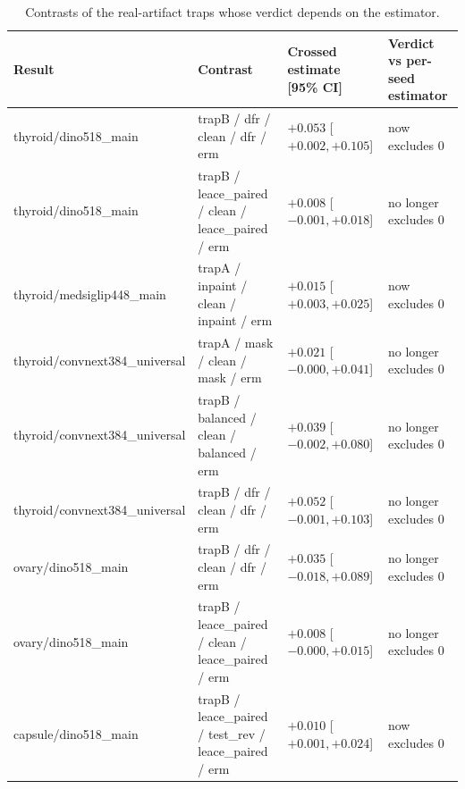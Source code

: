 \begin{table}[H]\centering\scriptsize
\caption{Contrasts of the real-artifact traps whose verdict depends on the estimator.}\label{tab:estchanges}
\begin{tabular}{p{4.2cm}p{5.2cm}p{3.3cm}p{2.6cm}}\toprule
Result & Contrast & Crossed estimate [95\% CI] & Verdict vs per-seed estimator \\\midrule
thyroid/\allowbreak{}dino518\_main & trapB /\allowbreak{} dfr /\allowbreak{} clean /\allowbreak{} dfr /\allowbreak{} erm & $+0.053$ [$+0.002, +0.105$] & now excludes 0 \\
thyroid/\allowbreak{}dino518\_main & trapB /\allowbreak{} leace\_paired /\allowbreak{} clean /\allowbreak{} leace\_paired /\allowbreak{} erm & $+0.008$ [$-0.001, +0.018$] & no longer excludes 0 \\
thyroid/\allowbreak{}medsiglip448\_main & trapA /\allowbreak{} inpaint /\allowbreak{} clean /\allowbreak{} inpaint /\allowbreak{} erm & $+0.015$ [$+0.003, +0.025$] & now excludes 0 \\
thyroid/\allowbreak{}convnext384\_universal & trapA /\allowbreak{} mask /\allowbreak{} clean /\allowbreak{} mask /\allowbreak{} erm & $+0.021$ [$-0.000, +0.041$] & no longer excludes 0 \\
thyroid/\allowbreak{}convnext384\_universal & trapB /\allowbreak{} balanced /\allowbreak{} clean /\allowbreak{} balanced /\allowbreak{} erm & $+0.039$ [$-0.002, +0.080$] & no longer excludes 0 \\
thyroid/\allowbreak{}convnext384\_universal & trapB /\allowbreak{} dfr /\allowbreak{} clean /\allowbreak{} dfr /\allowbreak{} erm & $+0.052$ [$-0.001, +0.103$] & no longer excludes 0 \\
ovary/\allowbreak{}dino518\_main & trapB /\allowbreak{} dfr /\allowbreak{} clean /\allowbreak{} dfr /\allowbreak{} erm & $+0.035$ [$-0.018, +0.089$] & no longer excludes 0 \\
ovary/\allowbreak{}dino518\_main & trapB /\allowbreak{} leace\_paired /\allowbreak{} clean /\allowbreak{} leace\_paired /\allowbreak{} erm & $+0.008$ [$-0.000, +0.015$] & no longer excludes 0 \\
capsule/\allowbreak{}dino518\_main & trapB /\allowbreak{} leace\_paired /\allowbreak{} test\_rev /\allowbreak{} leace\_paired /\allowbreak{} erm & $+0.010$ [$+0.001, +0.024$] & now excludes 0 \\
\bottomrule\end{tabular}
\end{table}
